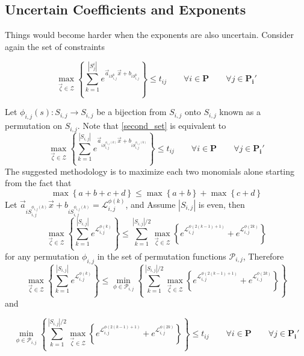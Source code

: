 \subsection{Uncertain Coefficients and Exponents}
Things would become harder when the exponents are also uncertain. Consider again the set of constraints

\begin{equation}
\max_{\vec{\zeta} \in \mathcal{Z}} \left\{\textstyle{\sum}_{k=1}^{|S_j^i|} e^{\vec{a}_{iS_{i,j}^k}\vec{x} + b_{iS_{i,j}^k}} \right\} \leq t_{ij} \qquad \forall i \in \mathbf{P} \qquad \forall j \in \mathbf{P_i'}
\label{second_set}
\end{equation}

Let $\phi_{i,j}(s) : S_{i,j} \rightarrow S_{i,j}$ be a bijection from $S_{i,j}$ onto $S_{i,j}$ known as a permutation on $S_{i,j}$. Note that \eqref{second_set} is equivalent to
\begin{equation}
\max_{\vec{\zeta} \in \mathcal{Z}} \left\{\textstyle{\sum}_{k=1}^{|S_{i,j}|} e^{\vec{a}_{iS_{i,j}^{\phi_{i,j}(k)}}\vec{x} + b_{iS_{i,j}^{\phi_{i,j}(k)}}} \right\} \leq t_{ij} \qquad \forall i \in \mathbf{P} \qquad \forall j \in \mathbf{P_i'}
\label{permutation_k_term}
\end{equation}
The suggested methodology is to maximize each two monomials alone starting from the fact that
$$
\max \left\{ a + b + c + d\right\} \leq \max \left\{a + b\right\} + \max \left\{c + d\right\}
$$
Let $\vec{a}_{iS_{i,j}^{\phi_{i,j}(k)}}\vec{x} + b_{iS_{i,j}^{\phi_{i,j}(k)}} = \mathcal{L}^{\phi(k)}_{i,j}$, and Assume $|S_{i,j}|$ is even, then
$$
\max_{\vec{\zeta} \in \mathcal{Z}} \left\{\textstyle{\sum}_{k=1}^{|S_{i,j}|} e^{\mathcal{L}^{\phi(k)}_{i,j}}\right\} \leq \textstyle{\sum}_{k=1}^{|S_{i,j}|/2} \max_{\vec{\zeta} \in \mathcal{Z}} \left\{e^{\mathcal{L}^{\phi(2(k-1)+1)}_{i,j}} + e^{\mathcal{L}^{\phi(2k)}_{i,j}}\right\}
$$
for any permutation $\phi_{i,j}$ in the set of permutation functions $\mathcal{P}_{i,j}$, Therefore
$$
\max_{\vec{\zeta} \in \mathcal{Z}} \left\{\textstyle{\sum}_{k=1}^{|S_{i,j}|} e^{\mathcal{L}^{\phi(k)}_{i,j}}\right\} \leq \min_{\phi \in \mathcal{P}_{i,j}}\left\{\textstyle{\sum}_{k=1}^{|S_{i,j}|/2} \max_{\vec{\zeta} \in \mathcal{Z}} \left\{e^{\mathcal{L}^{\phi(2(k-1)+1)}_{i,j}} + e^{\mathcal{L}^{\phi(2k)}_{i,j}}\right\}\right\}
$$
and

\begin{equation}
\min_{\phi \in \mathcal{P}_{i,j}}\left\{\textstyle{\sum}_{k=1}^{|S_{i,j}|/2} \max_{\vec{\zeta} \in \mathcal{Z}} \left\{e^{\mathcal{L}^{\phi(2(k-1)+1)}_{i,j}} + e^{\mathcal{L}^{\phi(2k)}_{i,j}}\right\}\right\} \leq t_{ij} \qquad \forall i \in \mathbf{P} \qquad \forall j \in \mathbf{P_i'}
\label{min_safe_app}
\end{equation}

